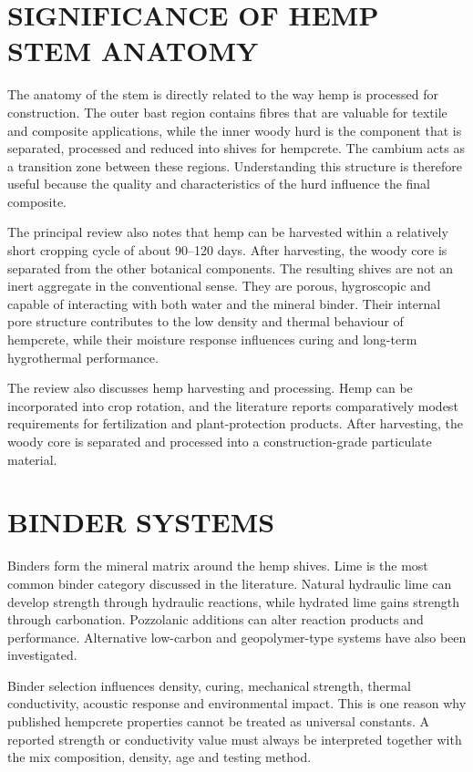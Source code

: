 \documentclass[12pt,a4paper,final]{report}
\begin{document}
\section[Significance of Hemp Stem Anatomy]{SIGNIFICANCE OF HEMP STEM ANATOMY}
The anatomy of the stem is directly related to the way hemp is processed for construction. The
outer bast region contains fibres that are valuable for textile and composite applications, while
the inner woody hurd is the component that is separated, processed and reduced into shives for
hempcrete. The cambium acts as a transition zone between these regions. Understanding this
structure is therefore useful because the quality and characteristics of the hurd influence the
final composite.

The principal review also notes that hemp can be harvested within a relatively short cropping
cycle of about 90--120 days. After harvesting, the woody core is separated from the other
botanical components. The resulting shives are not an inert aggregate in the conventional
sense. They are porous, hygroscopic and capable of interacting with both water and the
mineral binder. Their internal pore structure contributes to the low density and thermal
behaviour of hempcrete, while their moisture response influences curing and long-term
hygrothermal performance.

The review also discusses hemp harvesting and processing. Hemp can be incorporated into
crop rotation, and the literature reports comparatively modest requirements for fertilization
and plant-protection products. After harvesting, the woody core is separated and processed
into a construction-grade particulate material.

\section[Binder Systems]{BINDER SYSTEMS}
Binders form the mineral matrix around the hemp shives. Lime is the most common binder
category discussed in the literature. Natural hydraulic lime can develop strength through
hydraulic reactions, while hydrated lime gains strength through carbonation. Pozzolanic
additions can alter reaction products and performance. Alternative low-carbon and
geopolymer-type systems have also been investigated.

Binder selection influences density, curing, mechanical strength, thermal conductivity,
acoustic response and environmental impact. This is one reason why published hempcrete
properties cannot be treated as universal constants. A reported strength or conductivity value
must always be interpreted together with the mix composition, density, age and testing
method.
\end{document}
